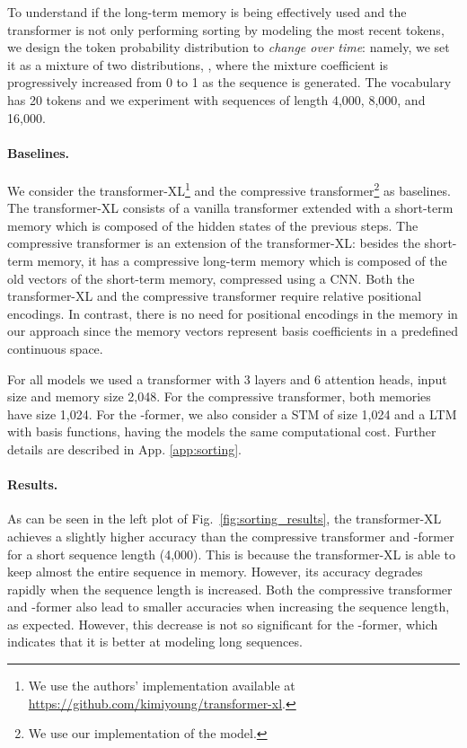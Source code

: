 \documentclass[11pt]{article}
\begin{document}
To understand if the long-term memory is being effectively used and the transformer is not only performing sorting by modeling the most recent tokens, we design the token probability distribution to \emph{change over time}: namely, we set it as a mixture of two  distributions, , where the mixture coefficient  is progressively increased from 0 to 1 as the sequence is generated. 
The vocabulary has 20 tokens and we experiment with sequences of length 4,000, 8,000, and 16,000. 

\paragraph{Baselines. }
We consider the transformer-XL\footnote{We use the authors' implementation available at \url{https://github.com/kimiyoung/transformer-xl}.} \citep{dai2019transformer} and the compressive transformer\footnote{We use our implementation of the model.} \citep{rae2019compressive} as baselines. The transformer-XL consists of a vanilla transformer \citep{vaswani2017attention} extended with a short-term memory which is composed of the hidden states of the previous steps. The compressive transformer is an extension of the transformer-XL: besides the short-term memory, it has a compressive long-term memory which is composed of  the old vectors of the short-term memory, compressed using a CNN. 
Both the transformer-XL and the compressive transformer require relative positional encodings. 
In contrast, there is no need for positional encodings in the memory in our approach since the memory vectors represent basis coefficients in a predefined continuous space. 

For all models we used a transformer with 3 layers and 6 attention heads, input size  and memory size 2,048. For the compressive transformer, both memories have size 1,024. For the \mbox{-former}, we also consider a STM of size 1,024 and a LTM with  basis functions, having the models the same computational cost.
Further details are described in App. \ref{app:sorting}.

\paragraph{Results. }
As can be seen in the left plot of Fig.~\ref{fig:sorting_results}, the transformer-XL achieves a slightly higher accuracy than the compressive transformer and  \mbox{-former} for a short sequence length (4,000). This is because the transformer-XL is able to keep almost the entire sequence in memory.
However, its accuracy degrades rapidly when the sequence length is increased. 
Both the compressive transformer and \mbox{-former} also lead to smaller accuracies when increasing the sequence length, as expected. However, this decrease is not so significant for the \mbox{-former}, which indicates that it is better at modeling long sequences.
\end{document}
